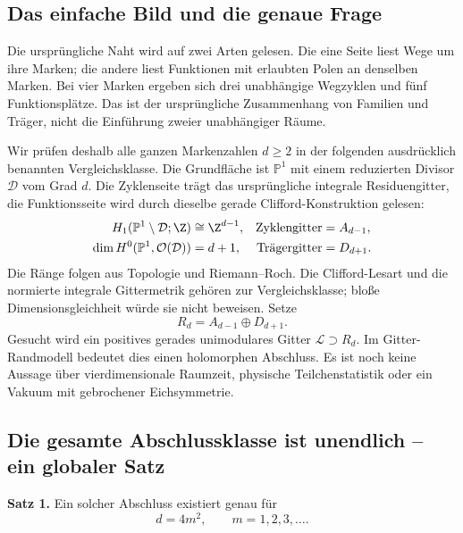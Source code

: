 \subsection{Das einfache Bild und die genaue Frage}

Die ursprüngliche Naht wird auf zwei Arten gelesen. Die eine Seite liest Wege um ihre Marken; die andere liest Funktionen mit erlaubten Polen an denselben Marken. Bei vier Marken ergeben sich drei unabhängige Wegzyklen und fünf Funktionsplätze. Das ist der ursprüngliche Zusammenhang von Familien und Träger, nicht die Einführung zweier unabhängiger Räume.


Wir prüfen deshalb alle ganzen Markenzahlen $d\ge2$ in der folgenden ausdrücklich benannten Vergleichsklasse. Die Grundfläche ist $\mathbb P^1$ mit einem reduzierten Divisor $\mathcal D$ vom Grad $d$. Die Zyklenseite trägt das ursprüngliche integrale Residuengitter, die Funktionsseite wird durch dieselbe gerade Clifford-Konstruktion gelesen:
\[
\begin{aligned}
 H_1(\mathbb P^1\setminus\mathcal D;\Z)&\cong\Z^{d-1},
 &\text{Zyklengitter}&=A_{d-1},\\
 \dim H^0(\mathbb P^1,\mathcal O(\mathcal D))&=d+1,
 &\text{Trägergitter}&=D_{d+1}.
\end{aligned}
\]
Die Ränge folgen aus Topologie und Riemann--Roch. Die Clifford-Lesart und die normierte integrale Gittermetrik gehören zur Vergleichsklasse; bloße Dimensionsgleichheit würde sie nicht beweisen. Setze
\[
 R_d=A_{d-1}\oplus D_{d+1}.
\]
Gesucht wird ein positives gerades unimodulares Gitter $\mathcal L\supset R_d$. Im Gitter-Randmodell bedeutet dies einen holomorphen Abschluss. Es ist noch keine Aussage über vierdimensionale Raumzeit, physische Teilchenstatistik oder ein Vakuum mit gebrochener Eichsymmetrie.

\subsection{Die gesamte Abschlussklasse ist unendlich -- ein globaler Satz}

\textbf{Satz 1.} Ein solcher Abschluss existiert genau für
\begin{equation}\label{eq:globalgluetower}
 \boxed{d=4m^2,\qquad m=1,2,3,\ldots .}
\end{equation}


